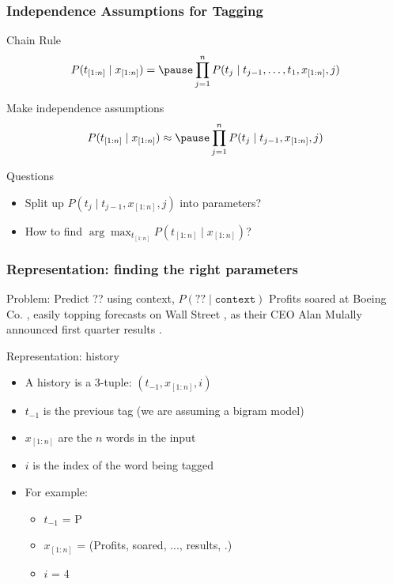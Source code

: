 \begin{frame}
\frametitle{Independence Assumptions for Tagging}
\begin{block}{Chain Rule}
\[ P( t_{[1:n]} \mid x_{[1:n]}) = \pause \prod_{j=1}^n P(t_j \mid t_{j-1}, \ldots, t_1, x_{[1:n]}, j) \]
\end{block}
\pause
\begin{block}{Make independence assumptions}
\[ P( t_{[1:n]} \mid x_{[1:n]}) \approx \pause \prod_{j=1}^n P(t_j \mid t_{j-1}, x_{[1:n]}, j) \]
\end{block}
\pause
\begin{block}{Questions}
\begin{itemize}
\item Split up $P(t_j \mid t_{j-1}, x_{[1:n]}, j)$ into parameters?
\item How to find $\arg\max_{t_{[1:n]}} P( t_{[1:n]} \mid x_{[1:n]})$?
\end{itemize}
\end{block}
\end{frame}

\begin{frame}
\frametitle{Representation: finding the right parameters}
\begin{block}{Problem: Predict ?? using context, $P(?? \mid \texttt{context})$ }
Profits soared at Boeing Co. , easily topping forecasts on Wall Street , as their CEO Alan Mulally announced first quarter results .
\end{block}
\pause
\begin{block}{Representation: history}
\begin{itemize}
\item A history is a 3-tuple: $(t_{-1}, x_{[1:n]}, i)$
\item $t_{-1}$ is the previous tag (we are assuming a bigram model)
\item $x_{[1:n]}$ are the $n$ words in the input
\item $i$ is the index of the word being tagged
\item For example:
    \begin{itemize}
    \item $t_{-1}$ = P
    \item $x_{[1:n]}$ = (Profits, soared, ..., results, .)
    \item $i$ = 4
    \end{itemize}
\end{itemize}
\end{block}
\end{frame}

